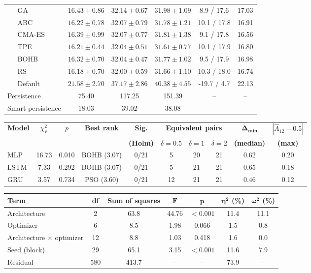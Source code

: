 \begin{tabular}{llccccc}
 & GA & $16.43 \pm 0.86$ & $32.14 \pm 0.67$ & $31.98 \pm 1.09$ & 8.9 / 17.6 & 17.03 \\
 & ABC & $16.22 \pm 0.78$ & $32.07 \pm 0.79$ & $31.78 \pm 1.21$ & 10.1 / 17.8 & 16.91 \\
 & CMA-ES & $16.39 \pm 0.99$ & $32.07 \pm 0.77$ & $31.81 \pm 1.38$ & 9.1 / 17.8 & 16.56 \\
 & TPE & $16.21 \pm 0.44$ & $32.04 \pm 0.51$ & $31.61 \pm 0.77$ & 10.1 / 17.9 & 16.80 \\
 & BOHB & $16.32 \pm 0.70$ & $32.04 \pm 0.47$ & $31.77 \pm 1.02$ & 9.5 / 17.9 & 16.98 \\
 & RS & $16.18 \pm 0.70$ & $32.00 \pm 0.59$ & $31.66 \pm 1.10$ & 10.3 / 18.0 & 16.74 \\
 & Default & $21.58 \pm 2.70$ & $37.17 \pm 2.86$ & $40.38 \pm 4.55$ & -19.7 / 4.7 & 22.13 \\
\midrule
\multicolumn{2}{l}{Persistence} & 75.40 & 117.25 & 151.39 & -- & -- \\
\multicolumn{2}{l}{Smart persistence} & 18.03 & 39.02 & 38.08 & -- & -- \\
\bottomrule
\end{tabular}

\begin{tabular}{lccccccccc}
\toprule
\textbf{Model} & $\chi^2_F$ & $p$ & \textbf{Best rank} & \textbf{Sig.} & \multicolumn{3}{c}{\textbf{Equivalent pairs}} & $\boldsymbol{\Delta_{\min}}$ & $|\hat{A}_{12}-0.5|$ \\
\cmidrule(lr){6-8}
 & & & & \textbf{(Holm)} & $\delta=0.5$ & $\delta=1$ & $\delta=2$ & \textbf{(median)} & \textbf{(max)} \\
\midrule
MLP & 16.73 & 0.010 & BOHB (3.07) & 0/21 & 5 & 20 & 21 & 0.62 & 0.20 \\
LSTM & 7.33 & 0.292 & BOHB (3.07) & 0/21 & 5 & 21 & 21 & 0.65 & 0.18 \\
GRU & 3.57 & 0.734 & PSO (3.60) & 0/21 & 12 & 21 & 21 & 0.46 & 0.12 \\
\bottomrule
\end{tabular}

\begin{tabular}{lcccccc}
\toprule
\textbf{Term} & \textbf{df} & \textbf{Sum of squares} & $\boldsymbol{F}$ & $\boldsymbol{p}$ & $\boldsymbol{\eta^2}$ \textbf{(\%)} & $\boldsymbol{\omega^2}$ \textbf{(\%)} \\
\midrule
Architecture & 2 & 63.8 & 44.76 & $<0.001$ & 11.4 & 11.1 \\
Optimizer & 6 & 8.5 & 1.98 & 0.066 & 1.5 & 0.8 \\
Architecture $\times$ optimizer & 12 & 8.8 & 1.03 & 0.418 & 1.6 & 0.0 \\
Seed (block) & 29 & 65.1 & 3.15 & $<0.001$ & 11.6 & 7.9 \\
Residual & 580 & 413.7 & -- & -- & 73.9 & -- \\
\bottomrule
\end{tabular}

